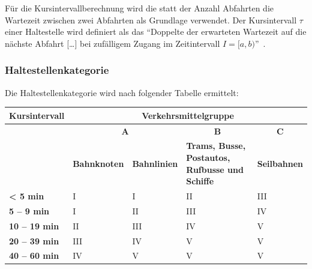 Für die Kursintervallberechnung wird die statt der Anzahl Abfahrten die Wartezeit zwischen zwei Abfahrten als Grundlage verwendet.
Der Kursintervall $\tau$ einer Haltestelle wird definiert als das "`Doppelte der erwarteten Wartezeit auf die nächste Abfahrt [\ldots] bei zufälligem Zugang im Zeitintervall $I = [a,b)$"'~\cite{visum_manual_formula}.

\subsubsection{Haltestellenkategorie}
\label{Zusammenhang zur Berechnungsmethodik ARE:Haltestellenkategorie}

\begin{itquote}
Die Haltestellenkategorie wird nach folgender Tabelle ermittelt:
\begin{table}[ht]
    \centering
    \begin{itquote}
    \begin{tabular}[c]{l | p{2.3cm} p{2.3cm} | p{2.2cm} | p{2.2cm}}
        \toprule
        \textbf{Kursintervall}
                                & \multicolumn{4}{c}{\textbf{Verkehrsmittelgruppe}}\\
        \midrule
        \textbf{}
                                & \multicolumn{2}{c|}{\textbf{A}}
                                & \multicolumn{1}{c}{\textbf{B}}
                                & \multicolumn{1}{c}{\textbf{C}}\\
        \textbf{}
                                & \textbf{Bahnknoten}
                                & \textbf{Bahnlinien}
                                & \textbf{Trams, Busse, Postautos, Rufbusse und Schiffe}
                                & \textbf{Seilbahnen}\\
        \textbf{< 5 min}
                                & I
                                & I
                                & II
                                & III\\
        \textbf{5 -- 9 min}
                                & I
                                & II
                                & III
                                & IV\\
        \textbf{10 -- 19 min}
                                & II
                                & III
                                & IV
                                & V\\
        \textbf{20 -- 39 min}
                                & III
                                & IV
                                & V
                                & V\\
        \textbf{40 -- 60 min}
                                & IV
                                & V
                                & V
                                & V\\
        \bottomrule
    \end{tabular}
    \end{itquote}
\end{table}
\end{itquote}

